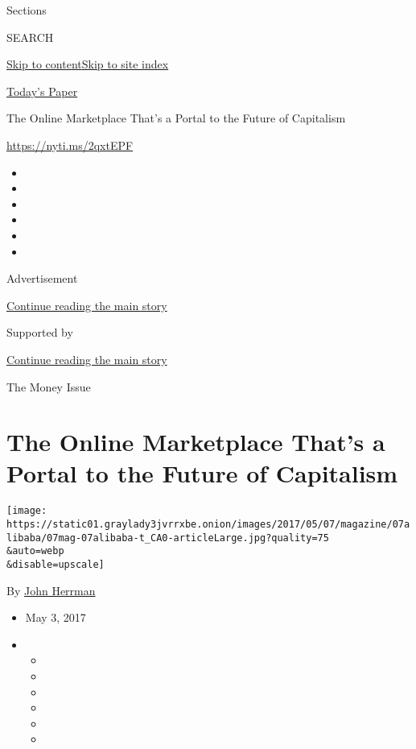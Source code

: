 Sections

SEARCH

\protect\hyperlink{site-content}{Skip to
content}\protect\hyperlink{site-index}{Skip to site index}

\href{https://myaccount.nytimes3xbfgragh.onion/auth/login?response_type=cookie\&client_id=vi}{}

\href{https://www.nytimes3xbfgragh.onion/section/todayspaper}{Today's
Paper}

The Online Marketplace That's a Portal to the Future of Capitalism

\url{https://nyti.ms/2qxtEPF}

\begin{itemize}
\item
\item
\item
\item
\item
\item
\end{itemize}

Advertisement

\protect\hyperlink{after-top}{Continue reading the main story}

Supported by

\protect\hyperlink{after-sponsor}{Continue reading the main story}

The Money Issue

\hypertarget{the-online-marketplace-thats-a-portal-to-the-future-of-capitalism}{%
\section{The Online Marketplace That's a Portal to the Future of
Capitalism}\label{the-online-marketplace-thats-a-portal-to-the-future-of-capitalism}}

\texttt{[image: https://static01.graylady3jvrrxbe.onion/images/2017/05/07/magazine/07alibaba/07mag-07alibaba-t\_CA0-articleLarge.jpg?quality=75\\\&auto=webp\\\&disable=upscale]}

By \href{https://www.nytimes3xbfgragh.onion/by/john-herrman}{John
Herrman}

\begin{itemize}
\item
  May 3, 2017
\item
  \begin{itemize}
  \item
  \item
  \item
  \item
  \item
  \item
  \end{itemize}
\end{itemize}

